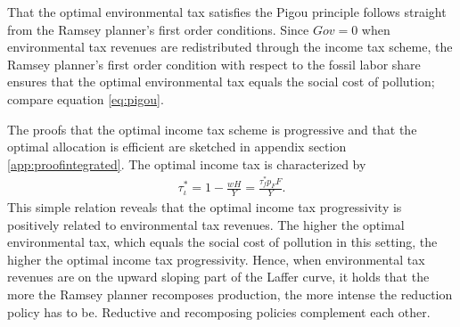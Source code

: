 	That the optimal environmental tax satisfies the Pigou principle follows straight from the Ramsey planner's first order conditions. Since $Gov=0$ when environmental tax revenues are redistributed through the income tax scheme, the Ramsey planner's first order condition with respect to the fossil labor share ensures that the optimal environmental tax equals the social cost of pollution; compare equation \ref{eq:pigou}. 
	
	The proofs that the optimal income tax scheme is progressive and that the optimal allocation is efficient are sketched in appendix section \ref{app:proofintegrated}. The optimal income tax is characterized by
\begin{align}
\tau^*_\iota=1-\frac{wH}{Y}=\frac{\tau_f^*p_FF}{Y}.
\end{align}
This simple relation reveals that the optimal income tax progressivity is positively related to environmental tax revenues.  The higher the optimal environmental tax, which equals the social cost of pollution in this setting, the higher the optimal income tax progressivity. Hence, when environmental tax revenues are on the upward sloping part of the Laffer curve, it holds that  the more the Ramsey planner recomposes production, the more intense the reduction policy has to be. Reductive and recomposing policies complement each other. 
 
\begin{comment}
\begin{prop}
Effect of using progressive income scheme on inequality (maybe as opposed to lump-sum transfers)
\end{prop}

content...
\end{comment}

